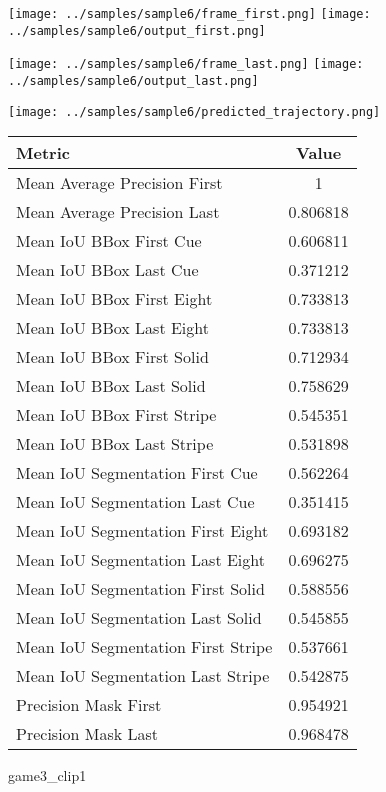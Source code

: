 \begin{figure}
\texttt{[image: ../samples/sample6/frame\_first.png]}
\texttt{[image: ../samples/sample6/output\_first.png]}\par
\texttt{[image: ../samples/sample6/frame\_last.png]}
\texttt{[image: ../samples/sample6/output\_last.png]}\par
\centering
\texttt{[image: ../samples/sample6/predicted\_trajectory.png]}
\caption{game3\_clip1}
\vspace{10pt}
\begin{tabular}{|l|c|}
\hline
\textbf{Metric} & \textbf{Value} \\
\hline
Mean Average Precision First & 1 \\
Mean Average Precision Last & 0.806818 \\
\hline
Mean IoU BBox First Cue & 0.606811 \\
Mean IoU BBox Last Cue & 0.371212 \\
Mean IoU BBox First Eight & 0.733813 \\
Mean IoU BBox Last Eight & 0.733813 \\
Mean IoU BBox First Solid & 0.712934 \\
Mean IoU BBox Last Solid & 0.758629 \\
Mean IoU BBox First Stripe & 0.545351 \\
Mean IoU BBox Last Stripe & 0.531898 \\
\hline
Mean IoU Segmentation First Cue & 0.562264 \\
Mean IoU Segmentation Last Cue & 0.351415 \\
Mean IoU Segmentation First Eight & 0.693182 \\
Mean IoU Segmentation Last Eight & 0.696275 \\
Mean IoU Segmentation First Solid & 0.588556 \\
Mean IoU Segmentation Last Solid & 0.545855 \\
Mean IoU Segmentation First Stripe & 0.537661 \\
Mean IoU Segmentation Last Stripe & 0.542875 \\
\hline
Precision Mask First & 0.954921 \\
Precision Mask Last & 0.968478 \\
\hline
\end{tabular}
\end{figure}

